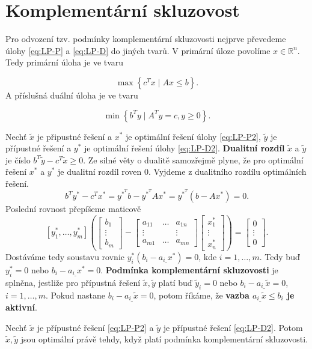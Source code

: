 \section{Komplementární skluzovost}

Pro odvození tzv. podmínky komplementární skluzovosti nejprve převedeme úlohy \ref{eq:LP-P} a \ref{eq:LP-D} do jiných tvarů. V primární úloze povolíme $x \in \mathbb{R}^n$. Tedy primární úloha je ve tvaru

\begin{equation}\tag{LP-P2}
    \max \left\{ c^T x \mid Ax \leq b \right\}.
    \label{eq:LP-P2}
\end{equation}
A příslušná duální úloha je ve tvaru

\begin{equation}\tag{LP-D2}
    \min \left\{ b^T y \mid A^T y = c, y \geq 0 \right\}.
    \label{eq:LP-D2}
\end{equation}

Nechť $\tilde{x}$ je připustné řešení a $x^*$ je optimální řešení úlohy \ref{eq:LP-P2}, $\tilde{y}$ je přípustné řešení a $y^*$ je optimální řešení úlohy \ref{eq:LP-D2}. \textbf{Dualitní rozdíl} $\tilde{x}$ a $\tilde{y}$ je číslo $b^T \tilde{y} - c^T \tilde{x} \geq 0$. Ze silné věty o dualitě samozřejmě plyne, že pro optimální řešení $x^*$ a $y^*$ je dualitní rozdíl roven $0$. Vyjdeme z dualitního rozdílu optimálních řešení.
$$
    b^T y^* - c^T x^* = y^{*^T} b - y^{*^T} A x^* = y^{*^T} \left( b - A x^* \right) = 0.
$$
Poslední rovnost přepíšeme maticově
$$
    \left[ y_1^*, \dots, y_m^* \right] \left(
        \begin{bmatrix}
            b_1    \\
            \vdots \\
            b_m
        \end{bmatrix}
        -
        \begin{bmatrix}
            a_{11} & \dots & a_{1n} \\
            \vdots & \     & \vdots \\
            a_{m1} & \dots & a_{mn}
        \end{bmatrix}
        \begin{bmatrix}
            x_1^*  \\
            \vdots \\
            x_n^*
        \end{bmatrix}
    \right)
    =
    \begin{bmatrix}
    0      \\
    \vdots \\
    0
    \end{bmatrix}.
$$
Dostáváme tedy soustavu rovnic $y_i^* \left( b_i - a_{i\_} x^* \right) = 0$, kde $i = 1, \dots, m$. Tedy buď $y_i^* = 0$ nebo $ b_i - a_{i\_} x^* = 0$. \textbf{Podmínka komplementární skluzovosti} je splněna, jestliže pro přípustná řešení $\tilde{x}, \tilde{y}$ platí buď $\tilde{y}_i = 0$ nebo $b_i - a_{i\_} \tilde{x} = 0$, $i = 1, \dots, m$. Pokud nastane $b_i - a_{i\_} \tilde{x} = 0$, potom říkáme, že \textbf{vazba $a_{i\_} \tilde{x} \leq b_i$ je aktivní}.

\begin{vt2}
    Nechť $\tilde{x}$ je přípustné řešení \ref{eq:LP-P2} a $\tilde{y}$ je přípustné řešení \ref{eq:LP-D2}. Potom $\tilde{x}, \tilde{y}$ jsou optimální právě tehdy, když platí podmínka komplementární skluzovosti.
\end{vt2}
